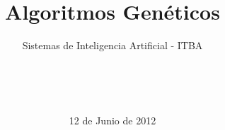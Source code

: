 \documentclass{sig-alternate}
\begin{document}

\title{Algoritmos Genéticos}
\subtitle{Sistemas de Inteligencia Artificial - ITBA}


\author{
	\\
	\\
	\\	
}

\date{12 de Junio de 2012}

\maketitle






\end{document}

